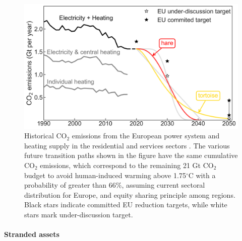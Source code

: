 \documentclass[5p]{elsarticle} %
\begin{document}
\begin{figure}[!h]
\centering
	\includegraphics[width=\columnwidth]{figures/carbon_budget.png}
\caption{Historical CO$_2$ emissions from the European power system and heating supply in the residential and services sectors \cite{UNFCCC_inventory}. The various future transition paths shown in the figure have the same cumulative CO$_2$ emissions, which correspond to the remaining 21 Gt CO$_2$ budget to avoid human-induced warming above 1.75$^{\circ}$C with a probability of greater than 66\%, assuming current sectoral distribution for Europe, and equity sharing principle among regions. Black stars indicate committed EU reduction targets, while white stars mark under-discussion target.} \label{fig_carbon_budget} 
\end{figure}

\paragraph{\textbf{Stranded assets}} \
\end{document}

